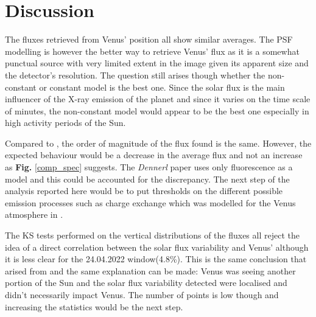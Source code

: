 \section{Discussion}


The fluxes retrieved from Venus' position all show similar averages. The PSF modelling is however the better way to retrieve Venus' flux as it is a somewhat punctual source with very limited extent in the image given its apparent size and the detector's resolution. The question still arises though whether the non-constant or constant model is the best one. Since the solar flux is the main influencer of the X-ray emission of the planet and since it varies on the time scale of minutes, the non-constant model would appear to be the best one especially in high activity periods of the Sun.

Compared to \cite{Dennerl2002DiscoveryChandra}, the order of magnitude of the flux found is the same. However, the expected behaviour would be a decrease in the average flux and not an increase as \textbf{Fig.} \ref{comp_spec} suggests. The \textit{Dennerl} paper uses only fluorescence as a model and this could be accounted for the discrepancy. The next step of the analysis reported here would be to put thresholds on the different possible emission processes such as charge exchange which was modelled for the Venus atmosphere in \cite{Gombosi1981THEABSORPTION}.

The KS tests performed on the vertical distributions of the fluxes all reject the idea of a direct correlation between the solar flux variability and Venus' although it is less clear for the 24.04.2022 window(4.8\%). This is the same conclusion that arised from \cite{Dennerl2002DiscoveryChandra} and the same explanation can be made: Venus was seeing another portion of the Sun and the solar flux variability detected were localised and didn't necessarily impact Venus. The number of points is low though and increasing the statistics would be the next step.

